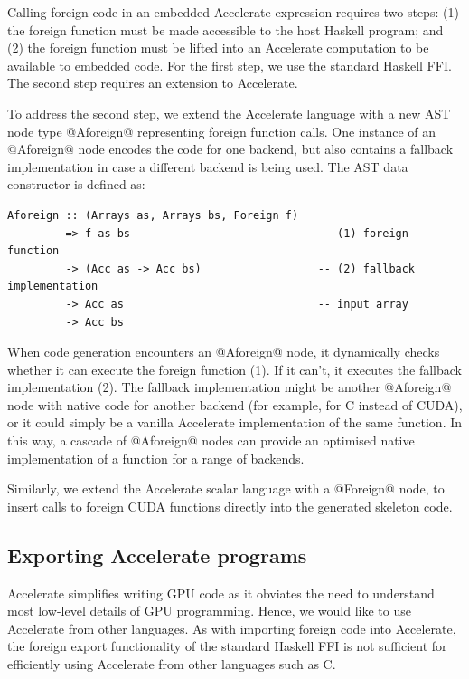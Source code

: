 Calling foreign code in an embedded Accelerate expression requires two steps:
(1) the foreign function must be made accessible to the host Haskell program;
and (2) the foreign function must be lifted into an Accelerate computation to be
available to embedded code. For the first step, we use the standard Haskell FFI.
The second step requires an extension to Accelerate.

To address the second step, we extend the Accelerate language with a new AST
node type @Aforeign@ representing foreign function calls. One instance of an
@Aforeign@ node encodes the code for one backend, but also contains a fallback
implementation in case a different backend is being used. The AST data
constructor is defined as:
%
\begin{lstlisting}[style=haskell]
Aforeign :: (Arrays as, Arrays bs, Foreign f)
         => f as bs                             -- (1) foreign function
         -> (Acc as -> Acc bs)                  -- (2) fallback implementation
         -> Acc as                              -- input array
         -> Acc bs
\end{lstlisting}
%
When code generation encounters an @Aforeign@ node, it dynamically checks
whether it can execute the foreign function (1). If it can't, it executes the
fallback implementation (2). The fallback implementation might be another @Aforeign@
node with native code for another backend (for example, for C instead of CUDA),
or it could simply be a vanilla Accelerate implementation of the same function.
In this way, a cascade of @Aforeign@ nodes can provide an optimised native
implementation of a function for a range of backends.

Similarly, we extend the Accelerate scalar language with a @Foreign@ node, to
insert calls to foreign CUDA functions directly into the generated skeleton
code.


\subsection{Exporting Accelerate programs}

Accelerate simplifies writing GPU code as it obviates the need to understand
most low-level details of GPU programming. Hence, we would like to use
Accelerate from other languages. As with importing foreign code into Accelerate,
the foreign export functionality of the standard Haskell FFI is not sufficient
for efficiently using Accelerate from other languages such as C.


